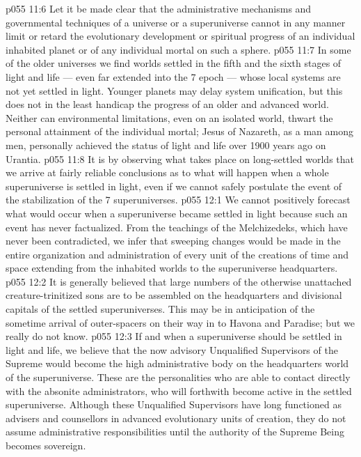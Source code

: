 \vs p055 11:6 Let it be made clear that the administrative mechanisms and governmental techniques of a universe or a superuniverse cannot in any manner limit or retard the evolutionary development or spiritual progress of an individual inhabited planet or of any individual mortal on such a sphere.
\vs p055 11:7 In some of the older universes we find worlds settled in the fifth and the sixth stages of light and life --- even far extended into the 7 epoch --- whose local systems are not yet settled in light. Younger planets may delay system unification, but this does not in the least handicap the progress of an older and advanced world. Neither can environmental limitations, even on an isolated world, thwart the personal attainment of the individual mortal; Jesus of Nazareth, as a man among men, personally achieved the status of light and life over 1900 years ago on Urantia.
\vs p055 11:8 It is by observing what takes place on long\hyp{}settled worlds that we arrive at fairly reliable conclusions as to what will happen when a whole superuniverse is settled in light, even if we cannot safely postulate the event of the stabilization of the 7 superuniverses.
\vs p055 12:1 We cannot positively forecast what would occur when a superuniverse became settled in light because such an event has never factualized. From the teachings of the Melchizedeks, which have never been contradicted, we infer that sweeping changes would be made in the entire organization and administration of every unit of the creations of time and space extending from the inhabited worlds to the superuniverse headquarters.
\vs p055 12:2 It is generally believed that large numbers of the otherwise unattached creature\hyp{}trinitized sons are to be assembled on the headquarters and divisional capitals of the settled superuniverses. This may be in anticipation of the sometime arrival of outer\hyp{}spacers on their way in to Havona and Paradise; but we really do not know.
\vs p055 12:3 \pc If and when a superuniverse should be settled in light and life, we believe that the now advisory Unqualified Supervisors of the Supreme would become the high administrative body on the headquarters world of the superuniverse. These are the personalities who are able to contact directly with the absonite administrators, who will forthwith become active in the settled superuniverse. Although these Unqualified Supervisors have long functioned as advisers and counsellors in advanced evolutionary units of creation, they do not assume administrative responsibilities until the authority of the Supreme Being becomes sovereign.
